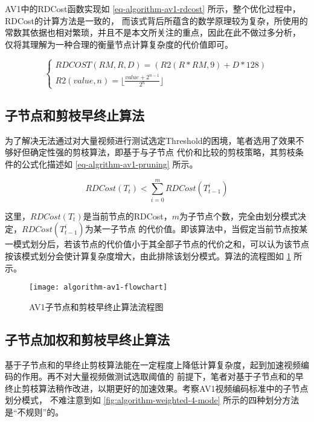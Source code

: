 AV1中的RDCost函数实现如 \ref{eq-algorithm-av1-rdcost} 所示，整个优化过程中，RDCost的计算方法是一致的，
而该式背后所蕴含的数学原理较为复杂，所使用的常数其依据也相对繁琐，并且不是本文所关注的重点，因此在此不做过多分析，
仅将其理解为一种合理的衡量节点计算复杂度的代价值即可。

\begin{equation}
\label{eq-algorithm-av1-rdcost}
\left\{\begin{array}{l}
RDCOST(RM, R, D) = (R2(R * RM, 9) + D * 128) \\
R2(value, n) = \lfloor \frac{value + 2^{n-1}}{2^n} \rfloor
\end{array}\right.
\end{equation}

\subsection{子节点和剪枝早终止算法}

为了解决无法通过对大量视频进行测试选定Threshold的困境，笔者选用了效果不够好但确定性强的剪枝算法，即基于与子节点
代价和比较的剪枝策略，其剪枝条件的公式化描述如 \ref{eq-algrithm-av1-pruning} 所示。

\begin{equation}
\label{eq-algrithm-av1-pruning}
RDCost(T_t) < \sum_{i=0}^m RDCost(T^i_{t-1})
\end{equation}

这里，$RDCost(T_t)$是当前节点的RDCost，$m$为子节点个数，完全由划分模式决定，$RDCost(T^i_{t-1})$为某一子节点
的代价值。即该算法中，当假定当前节点按某一模式划分后，若该节点的代价值小于其全部子节点的代价之和，可以认为该节点
按该模式划分会使计算复杂度增大，由此排除该划分模式。算法的流程图如 \ref{fig:algorithm-av1-flowchart} 所示。

\begin{figure}[H] %
  \centering
  \texttt{[image: algorithm-av1-flowchart]}
  \caption{AV1子节点和剪枝早终止算法流程图}
  \label{fig:algorithm-av1-flowchart}
\end{figure}

\subsection{子节点加权和剪枝早终止算法}

基于子节点和的早终止剪枝算法能在一定程度上降低计算复杂度，起到加速视频编码的作用。再不对大量视频做测试选取阈值的
前提下，笔者对基于子节点和的早终止剪枝算法稍作改进，以期更好的加速效果。考察AV1视频编码标准中的子节点划分模式，
不难注意到如 \ref{fig:algorithm-weighted-4-mode} 所示的四种划分方法是“不规则”的。

